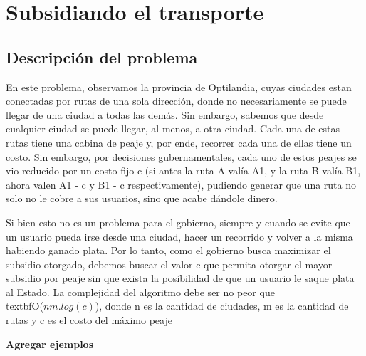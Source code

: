 \section{Subsidiando el transporte}

\subsection{Descripción del problema}
En este problema, observamos la provincia de Optilandia, cuyas ciudades estan conectadas por rutas de una sola dirección, donde no necesariamente se puede llegar de una ciudad a todas las demás. Sin embargo, sabemos que desde cualquier ciudad se puede llegar, al menos, a otra ciudad. Cada una de estas rutas tiene una cabina de peaje y, por ende, recorrer cada una de ellas tiene un costo. Sin embargo, por decisiones gubernamentales, cada uno de estos peajes se vio reducido por un costo fijo c (si antes la ruta A valía A1, y la ruta B valía B1, ahora valen A1 - c y B1 - c respectivamente), pudiendo generar que una ruta no solo no le cobre a sus usuarios, sino que acabe dándole dinero.
\\
\par
Si bien esto no es un problema para el gobierno, siempre y cuando se evite que un usuario pueda irse desde una ciudad, hacer un recorrido y volver a la misma habiendo ganado plata. Por lo tanto, como el gobierno busca maximizar el subsidio otorgado, debemos buscar el valor c que permita otorgar el mayor subsidio por peaje sin que exista la posibilidad de que un usuario le saque plata al Estado. La complejidad del algoritmo debe ser no peor que \\textbf{O($nm.log(c)$)}, donde n es la cantidad de ciudades, m es la cantidad de rutas y c es el costo del máximo peaje
\\
\par

\textbf{Agregar ejemplos}
\\
\par

